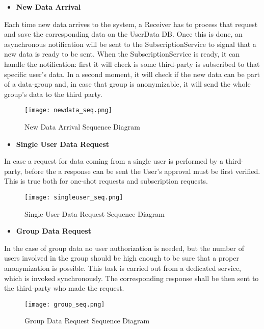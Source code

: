 \begin{itemize}
	\item \textbf{New Data Arrival}
\end{itemize}
Each time new data arrives to the system, a Receiver has to process that request and save the corresponding data on the UserData DB. Once this is done, an asynchronous notification will be sent to the SubscriptionService to signal that a new data is ready to be sent.
When the SubscriptionService is ready, it can handle the notification: first it will check is some third-party is subscribed to that specific user's data. In a second moment, it will check if the new data can be part of a data-group and, in case that group is anonymizable, it will send the whole group's data to the third party.

\FloatBarrier
\begin{figure}[!h]
	\centering
	\texttt{[image: newdata\_seq.png]}
	\caption{New Data Arrival Sequence Diagram}
\end{figure}
\FloatBarrier


\begin{itemize}
	\item \textbf{Single User Data Request}
\end{itemize}
In case a request for data coming from a single user is performed by a third-party, before the a response can be sent the User's approval must be first verified. This is true both for one-shot requests and subscription requests.

\FloatBarrier
\begin{figure}[!h]
	\centering
	\texttt{[image: singleuser\_seq.png]}
	\caption{Single User Data Request Sequence Diagram}
\end{figure}
\FloatBarrier


\begin{itemize}
	\item \textbf{Group Data Request}
\end{itemize}
In the case of group data no user authorization is needed, but the number of users involved in the group should be high enough to be sure that a proper anonymization is possible. This task is carried out from a dedicated service, which is invoked synchronously.
The corresponding response shall be then sent to the third-party who made the request.

\FloatBarrier
\begin{figure}[!h]
	\centering
	\texttt{[image: group\_seq.png]}
	\caption{Group Data Request Sequence Diagram}
\end{figure}
\FloatBarrier


